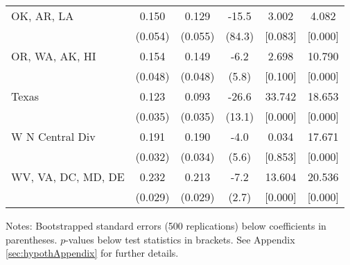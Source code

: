 \begin{landscape}
\begin{table}[ht]
{\begin{threeparttable}
\begin{tabular}{lccccc}
OK, AR, LA & 0.150 & 0.129 & -15.5 & 3.002 & 4.082 \\ 
 & (0.054) & (0.055) & (84.3) & [0.083] & [0.000] \\ 
OR, WA, AK, HI & 0.154 & 0.149 & -6.2 & 2.698 & 10.790 \\ 
 & (0.048) & (0.048) & (5.8) & [0.100] & [0.000] \\ 
Texas & 0.123 & 0.093 & -26.6 & 33.742 & 18.653 \\ 
 & (0.035) & (0.035) & (13.1) & [0.000] & [0.000] \\ 
W N Central Div & 0.191 & 0.190 & -4.0 & 0.034 & 17.671 \\ 
 & (0.032) & (0.034) & (5.6) & [0.853] & [0.000] \\ 
WV, VA, DC, MD, DE & 0.232 & 0.213 & -7.2 & 13.604 & 20.536 \\ 
 & (0.029) & (0.029) & (2.7) & [0.000] & [0.000] \\ 
\bottomrule
\end{tabular}
{\footnotesize {\raggedright Notes: Bootstrapped standard errors (500 replications) below coefficients in parentheses. $p$-values below test statistics in brackets. See Appendix \ref{sec:hypothAppendix} for further details.}}
\end{threeparttable}
}
\end{table}
\end{landscape}
